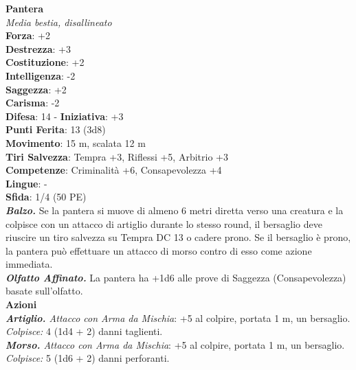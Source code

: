 \begin{multicols}{2}
\medskip\textbf{Pantera}\\
\emph{Media bestia, disallineato}\\
\textbf{Forza}: +2\\
\textbf{Destrezza}: +3\\
\textbf{Costituzione}: +2\\
\textbf{Intelligenza}: -2\\
\textbf{Saggezza}: +2\\
\textbf{Carisma}: -2\\
\textbf{Difesa}: 14 - \textbf{Iniziativa}: +3\\
\textbf{Punti Ferita}: 13 (3d8)\\
\textbf{Movimento}: 15 m, scalata 12 m\\
\textbf{Tiri Salvezza}: Tempra +3, Riflessi +5, Arbitrio +3 \\
\textbf{Competenze}: Criminalità +6, Consapevolezza +4\\
\textbf{Lingue}: -\\
\textbf{Sfida}: 1/4 (50 PE)\smallskip\\
\emph{\textbf{Balzo.}} Se la pantera si muove di almeno 6 metri diretta verso una creatura e la colpisce con un attacco di artiglio durante lo stesso round, il bersaglio deve riuscire un tiro salvezza su Tempra DC  13 o cadere prono. Se il bersaglio è prono, la pantera può effettuare un attacco di morso contro di esso come azione immediata.\\
\emph{\textbf{Olfatto Affinato.}} La pantera ha +1d6 alle prove di Saggezza (Consapevolezza) basate sull'olfatto.\\
\smallskip\textbf{Azioni}\\
\emph{\textbf{Artiglio.} Attacco con Arma da Mischia}: +5 al colpire, portata 1 m, un bersaglio.\\
\emph{Colpisce:} 4 (1d4 + 2) danni taglienti.\\
\emph{\textbf{Morso.} Attacco con Arma da Mischia}: +5 al colpire, portata 1 m, un bersaglio.\\
\emph{Colpisce:} 5 (1d6 + 2) danni perforanti.\\


\end{multicols}
